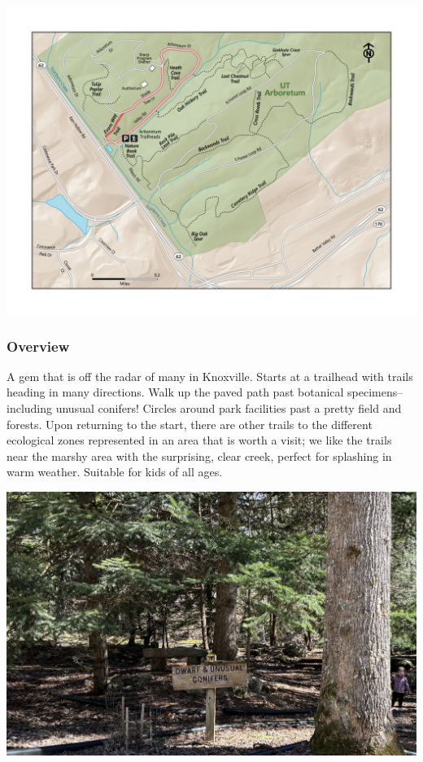 \documentclass[
  letterpaper,
  DIV=11,
  numbers=noendperiod]{scrartcl}
\begin{document}
\includegraphics{maps/trail-05-map.jpeg}

\hypertarget{overview-4}{%
\subsubsection{Overview}\label{overview-4}}

A gem that is off the radar of many in Knoxville. Starts at a trailhead
with trails heading in many directions. Walk up the paved path past
botanical specimens--including unusual conifers! Circles around park
facilities past a pretty field and forests. Upon returning to the start,
there are other trails to the different ecological zones represented in
an area that is worth a visit; we like the trails near the marshy area
with the surprising, clear creek, perfect for splashing in warm weather.
Suitable for kids of all ages.

\includegraphics{img/trail-05-figure-01.jpg}
\end{document}
